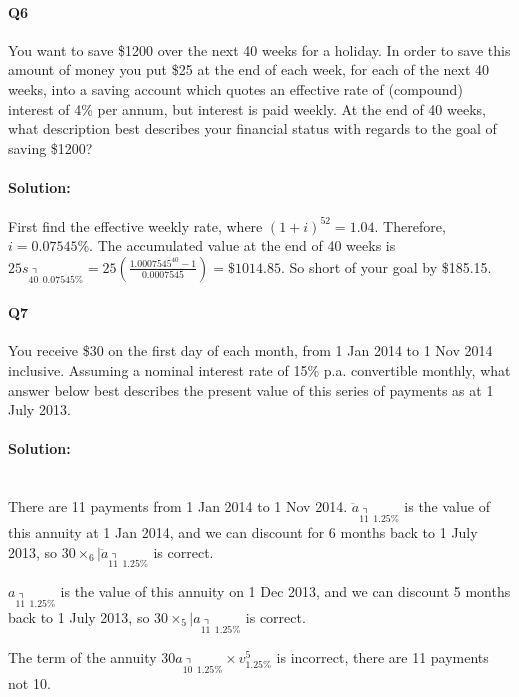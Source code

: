 \documentclass[a4paper, 11pt, twoside]{article}
\begin{document}
\paragraph{Q6} You want to save \$1200 over the next 40 weeks for a holiday. In order to save this amount of money you put \$25 at the end of each week, for each of the next 40 weeks, into a saving account which quotes an effective rate of (compound) interest of 4\% per annum, but interest is paid weekly. At the end of 40 weeks, what description best describes your financial status with regards to the goal of saving \$1200?\\

\paragraph{Solution:} First find the effective weekly rate, where $(1+i)^{52}=1.04$. Therefore, $i=0.07545\%$. The accumulated value at the end of 40 weeks is $25s_{\annuity{40\ \ }0.07545\%}=25\left(\frac{1.0007545^{40}-1}{0.0007545}\right)=\$1014.85$. So short of your goal by \$185.15.\\

\paragraph{Q7} You receive \$30 on the first day of each month, from 1 Jan 2014 to 1 Nov 2014 inclusive. Assuming a nominal interest rate of 15\% p.a. convertible monthly, what answer below best describes the present value of this series of payments as at 1 July 2013.\\

\paragraph{Solution:}\ \\

There are 11 payments from 1 Jan 2014 to 1 Nov 2014. $\ddot{a}_{\annuity{11\ \ }1.25\%}$ is the value of this annuity at 1 Jan 2014, and we can discount for 6 months back to 1 July 2013, so $30\times _6\big\vert\ddot{a}_{\annuity{11\ \ }1.25\%}$ is correct.

$a_{\annuity{11\ \ }1.25\%}$ is the value of this annuity on 1 Dec 2013, and we can discount 5 months back to 1 July 2013, so $30\times _5\big\vert a_{\annuity{11\ \ }1.25\%}$ is correct.

The term of the annuity $30a_{\annuity{10\ \ }1.25\%}\times v^5_{1.25\%}$ is incorrect, there are 11 payments not 10.
\end{document}
